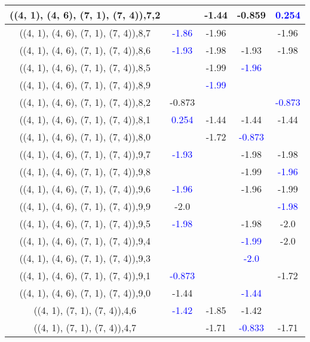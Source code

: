 \documentclass{article}
\begin{document}
\begin{center}
\begin{longtable}{|c|c|c|c|c|}
        	\hline
        	((4, 1), (4, 6), (7, 1), (7, 4)),7,2&&-1.44&-0.859& \textcolor{blue}{0.254}\\
        	\hline
        	((4, 1), (4, 6), (7, 1), (7, 4)),8,7& \textcolor{blue}{-1.86}&-1.96&&-1.96\\
        	\hline
        	((4, 1), (4, 6), (7, 1), (7, 4)),8,6& \textcolor{blue}{-1.93}&-1.98&-1.93&-1.98\\
        	\hline
        	((4, 1), (4, 6), (7, 1), (7, 4)),8,5&&-1.99& \textcolor{blue}{-1.96}&\\
        	\hline
        	((4, 1), (4, 6), (7, 1), (7, 4)),8,9&& \textcolor{blue}{-1.99}&&\\
        	\hline
        	((4, 1), (4, 6), (7, 1), (7, 4)),8,2&-0.873&&& \textcolor{blue}{-0.873}\\
        	\hline
        	((4, 1), (4, 6), (7, 1), (7, 4)),8,1& \textcolor{blue}{0.254}&-1.44&-1.44&-1.44\\
        	\hline
        	((4, 1), (4, 6), (7, 1), (7, 4)),8,0&&-1.72& \textcolor{blue}{-0.873}&\\
        	\hline
        	((4, 1), (4, 6), (7, 1), (7, 4)),9,7& \textcolor{blue}{-1.93}&&-1.98&-1.98\\
        	\hline
        	((4, 1), (4, 6), (7, 1), (7, 4)),9,8&&&-1.99& \textcolor{blue}{-1.96}\\
        	\hline
        	((4, 1), (4, 6), (7, 1), (7, 4)),9,6& \textcolor{blue}{-1.96}&&-1.96&-1.99\\
        	\hline
        	((4, 1), (4, 6), (7, 1), (7, 4)),9,9&-2.0&&& \textcolor{blue}{-1.98}\\
        	\hline
        	((4, 1), (4, 6), (7, 1), (7, 4)),9,5& \textcolor{blue}{-1.98}&&-1.98&-2.0\\
        	\hline
        	((4, 1), (4, 6), (7, 1), (7, 4)),9,4&&& \textcolor{blue}{-1.99}&-2.0\\
        	\hline
        	((4, 1), (4, 6), (7, 1), (7, 4)),9,3&&& \textcolor{blue}{-2.0}&\\
        	\hline
        	((4, 1), (4, 6), (7, 1), (7, 4)),9,1& \textcolor{blue}{-0.873}&&&-1.72\\
        	\hline
        	((4, 1), (4, 6), (7, 1), (7, 4)),9,0&-1.44&& \textcolor{blue}{-1.44}&\\
        	\hline
        	((4, 1), (7, 1), (7, 4)),4,6& \textcolor{blue}{-1.42}&-1.85&-1.42&\\
        	\hline
        	((4, 1), (7, 1), (7, 4)),4,7&&-1.71& \textcolor{blue}{-0.833}&-1.71\\

\end{longtable}
\end{center}
\end{document}
